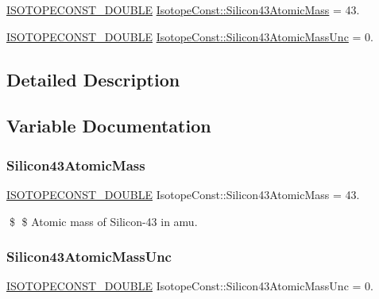 \begin{DoxyCompactItemize}
\item 
\mbox{\hyperlink{group___isotope_const-_macros_ga8f45a7272ce02c0b4c65c44636ed719a}{I\+S\+O\+T\+O\+P\+E\+C\+O\+N\+S\+T\+\_\+\+D\+O\+U\+B\+LE}} \mbox{\hyperlink{group___isotope_const-_silicon-_si43_ga01dc3dcc82dc09312321f531f0b6d2f3}{Isotope\+Const\+::\+Silicon43\+Atomic\+Mass}} = 43.
\item 
\mbox{\hyperlink{group___isotope_const-_macros_ga8f45a7272ce02c0b4c65c44636ed719a}{I\+S\+O\+T\+O\+P\+E\+C\+O\+N\+S\+T\+\_\+\+D\+O\+U\+B\+LE}} \mbox{\hyperlink{group___isotope_const-_silicon-_si43_ga7370f61aca5b05aab7de7e7438646160}{Isotope\+Const\+::\+Silicon43\+Atomic\+Mass\+Unc}} = 0.
\end{DoxyCompactItemize}


\subsection{Detailed Description}


\subsection{Variable Documentation}
\mbox{\label{group___isotope_const-_silicon-_si43_ga01dc3dcc82dc09312321f531f0b6d2f3}} 
\subsubsection{\texorpdfstring{Silicon43\+Atomic\+Mass}{Silicon43AtomicMass}}
{\footnotesize\ttfamily \mbox{\hyperlink{group___isotope_const-_macros_ga8f45a7272ce02c0b4c65c44636ed719a}{I\+S\+O\+T\+O\+P\+E\+C\+O\+N\+S\+T\+\_\+\+D\+O\+U\+B\+LE}} Isotope\+Const\+::\+Silicon43\+Atomic\+Mass = 43.}

\$ \$ Atomic mass of Silicon-\/43 in amu. \mbox{\label{group___isotope_const-_silicon-_si43_ga7370f61aca5b05aab7de7e7438646160}} 
\subsubsection{\texorpdfstring{Silicon43\+Atomic\+Mass\+Unc}{Silicon43AtomicMassUnc}}
{\footnotesize\ttfamily \mbox{\hyperlink{group___isotope_const-_macros_ga8f45a7272ce02c0b4c65c44636ed719a}{I\+S\+O\+T\+O\+P\+E\+C\+O\+N\+S\+T\+\_\+\+D\+O\+U\+B\+LE}} Isotope\+Const\+::\+Silicon43\+Atomic\+Mass\+Unc = 0.}

